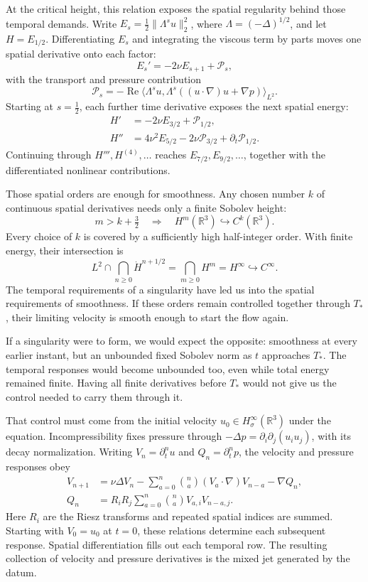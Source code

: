At the critical height, this relation exposes the spatial regularity
behind those temporal demands. Write
\(E_s=\tfrac12\|\Lambda^su\|_2^2\), where
\(\Lambda=(-\Delta)^{1/2}\), and let \(H=E_{1/2}\).
Differentiating \(E_s\) and integrating the viscous term by parts moves
one spatial derivative onto each factor:
\[
 E_s'=-2\nu E_{s+1}+\mathcal P_s,
\]
with the transport and pressure contribution
\[
 \mathcal P_s=-\operatorname{Re}\langle\Lambda^su,
 \Lambda^s((u\cdot\nabla)u+\nabla p)\rangle_{L^2}.
\]
Starting at \(s=\tfrac12\), each further time derivative exposes the next
spatial energy:
\[
 \begin{aligned}
 H'&=-2\nu E_{3/2}+\mathcal P_{1/2},\\
 H''&=4\nu^2E_{5/2}-2\nu\mathcal P_{3/2}
        +\partial_t\mathcal P_{1/2}.
 \end{aligned}
\]
Continuing through \(H''',H^{(4)},\ldots\) reaches
\(E_{7/2},E_{9/2},\ldots\), together with the differentiated nonlinear
contributions.

Those spatial orders are enough for smoothness. Any chosen number \(k\)
of continuous spatial derivatives needs only a finite Sobolev height:
\[
 m>k+\tfrac32
 \quad\Longrightarrow\quad H^m(\mathbb R^3)\hookrightarrow C^k(\mathbb R^3).
\]
Every choice of \(k\) is covered by a sufficiently high half-integer order.
With finite energy, their intersection is
\[
 L^2\cap\bigcap_{n\ge0}\dot H^{n+1/2}
 =\bigcap_{m\ge0}H^m
 =H^\infty\hookrightarrow C^\infty.
\]
The temporal requirements of a singularity have led us into the spatial
requirements of smoothness. If these orders remain controlled together
through \(T_*\), their limiting velocity is smooth enough to start the
flow again.

If a singularity were to form, we would expect the opposite: smoothness at
every earlier instant, but an unbounded fixed Sobolev norm as \(t\) approaches
\(T_*\). The temporal responses would become unbounded too, even while total
energy remained finite. Having all finite derivatives before \(T_*\) would
not give us the control needed to carry them through it.

That control must come from the initial velocity
\(u_0\in H^\infty_\sigma(\mathbb R^3)\) under the equation.
Incompressibility fixes pressure through
\(-\Delta p=\partial_i\partial_j(u_i u_j)\), with its decay normalization.
Writing \(V_n=\partial_t^nu\) and \(Q_n=\partial_t^np\), the velocity
and pressure responses obey
\[
 \begin{aligned}
 V_{n+1}&=\nu\Delta V_n
 -\sum_{a=0}^n\binom na(V_a\cdot\nabla)V_{n-a}-\nabla Q_n,\\
 Q_n&=R_iR_j\sum_{a=0}^n\binom na V_{a,i}V_{n-a,j}.
 \end{aligned}
\]
Here \(R_i\) are the Riesz transforms and repeated spatial indices are
summed. Starting with \(V_0=u_0\) at \(t=0\), these relations determine
each subsequent response. Spatial differentiation fills out each temporal
row. The resulting collection of velocity and pressure derivatives is the
mixed jet generated by the datum.

